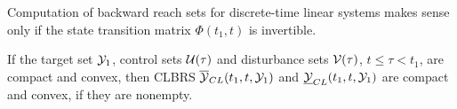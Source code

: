 Computation of backward reach sets for discrete-time linear systems
makes sense only if the state transition matrix $\Phi(t_1, t)$ is invertible.

If the target set $\YY_1$, control sets $\UU(\tau)$ and disturbance
sets $\VV(\tau)$, $t\leq\tau<t_1$, are compact and convex, then
CLBRS $\OYCL(t_1, t, \YY_1)$ and $\UYCL(t_1, t, \YY_1)$ are compact and convex, if they are nonempty.


























